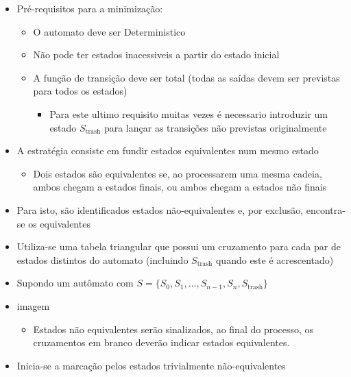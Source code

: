\documentclass[12pt]{article}
\begin{document}
\begin{itemize}
\begin{itemize}
            \item Pré-requisitos para a minimização:
            \begin{itemize}
                \item O automato deve ser Deterministico
                \item Não pode ter estados inacessiveis a partir do estado 
                inicial
                \item A função de transição deve ser total (todas as saídas 
                devem ser previstas para todos os estados)
                \begin{itemize}
                    \item Para este ultimo requisito muitas vezes é necessario 
                    introduzir um estado $S_\text{trash}$ para lançar as 
                    transições não previstas originalmente
                \end{itemize}
            \end{itemize}
            \item A estratégia consiste em fundir estados equivalentes num mesmo 
            estado
            \begin{itemize}
                \item Dois estados são equivalentes se, ao processarem uma mesma 
                cadeia, ambos chegam a estados finais, ou ambos chegam a estados 
                não finais
            \end{itemize}
            \item Para isto, são identificados estados não-equivalentes e, por 
            exclusão, encontra-se os equivalentes
            \item Utiliza-se uma tabela triangular que possui um cruzamento para 
            cada par de estados distintos do automato (incluindo $S_\text{trash}$ 
            quando este é acrescentado)
            \item Supondo um autômato com $S=\{S_0,S_1, \dots, S_{n-1}, S_n, 
            S_\text{trash}\}$ 
            \item [] imagem
            \begin{itemize}
                \item Estados não equivalentes serão sinalizados, ao final do 
                processo, os cruzamentos em branco deverão indicar estados 
                equivalentes.
            \end{itemize}
            \item Inicia-se a marcação pelos estados trivialmente não-equivalentes

\end{itemize}
\end{itemize}
\end{document}
